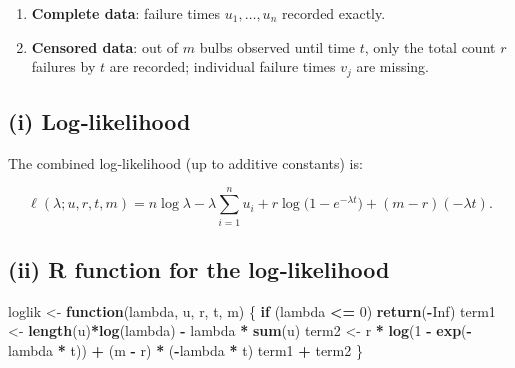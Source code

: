 \documentclass[
]{article}
\newenvironment{Shaded}{\begin{snugshade}}{\end{snugshade}}
\newcommand{\ConstantTok}[1]{\textcolor[rgb]{0.56,0.35,0.01}{#1}}
\newcommand{\ControlFlowTok}[1]{\textcolor[rgb]{0.13,0.29,0.53}{\textbf{#1}}}
\newcommand{\DecValTok}[1]{\textcolor[rgb]{0.00,0.00,0.81}{#1}}
\newcommand{\FunctionTok}[1]{\textcolor[rgb]{0.13,0.29,0.53}{\textbf{#1}}}
\newcommand{\NormalTok}[1]{#1}
\newcommand{\OtherTok}[1]{\textcolor[rgb]{0.56,0.35,0.01}{#1}}
\newcommand{\SpecialCharTok}[1]{\textcolor[rgb]{0.81,0.36,0.00}{\textbf{#1}}}
\providecommand{\tightlist}{%
  \setlength{\itemsep}{0pt}\setlength{\parskip}{0pt}}
\begin{document}
\begin{enumerate}
\def\labelenumi{\arabic{enumi}.}
\tightlist
\item
  \textbf{Complete data}: failure times \(u_1, \dots, u_n\) recorded
  exactly.
\item
  \textbf{Censored data}: out of \(m\) bulbs observed until time \(t\),
  only the total count \(r\) failures by \(t\) are recorded; individual
  failure times \(v_j\) are missing.
\end{enumerate}

\subsection{(i) Log‑likelihood}\label{i-loglikelihood}

The combined log‑likelihood (up to additive constants) is:

\[
\ell(\lambda; u, r, t, m)
= n\log\lambda - \lambda \sum_{i=1}^n u_i
  + r\log\bigl(1 - e^{-\lambda t}\bigr)
  + (m - r)(-\lambda t).
\]

\subsection{(ii) R function for the
log‑likelihood}\label{ii-r-function-for-the-loglikelihood}

\begin{Shaded}
\begin{Highlighting}[]
\NormalTok{loglik }\OtherTok{\textless{}{-}} \ControlFlowTok{function}\NormalTok{(lambda, u, r, t, m) \{}
  \ControlFlowTok{if}\NormalTok{ (lambda }\SpecialCharTok{\textless{}=} \DecValTok{0}\NormalTok{) }\FunctionTok{return}\NormalTok{(}\SpecialCharTok{{-}}\ConstantTok{Inf}\NormalTok{)}
\NormalTok{  term1 }\OtherTok{\textless{}{-}} \FunctionTok{length}\NormalTok{(u)}\SpecialCharTok{*}\FunctionTok{log}\NormalTok{(lambda) }\SpecialCharTok{{-}}\NormalTok{ lambda }\SpecialCharTok{*} \FunctionTok{sum}\NormalTok{(u)}
\NormalTok{  term2 }\OtherTok{\textless{}{-}}\NormalTok{ r }\SpecialCharTok{*} \FunctionTok{log}\NormalTok{(}\DecValTok{1} \SpecialCharTok{{-}} \FunctionTok{exp}\NormalTok{(}\SpecialCharTok{{-}}\NormalTok{lambda }\SpecialCharTok{*}\NormalTok{ t)) }\SpecialCharTok{+}\NormalTok{ (m }\SpecialCharTok{{-}}\NormalTok{ r) }\SpecialCharTok{*}\NormalTok{ (}\SpecialCharTok{{-}}\NormalTok{lambda }\SpecialCharTok{*}\NormalTok{ t)}
\NormalTok{  term1 }\SpecialCharTok{+}\NormalTok{ term2}
\NormalTok{\}}
\end{Highlighting}
\end{Shaded}
\end{document}
